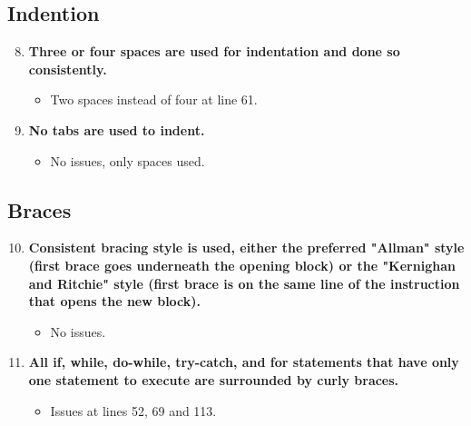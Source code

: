 \documentclass{article}
\begin{document}
		\subsection{Indention}
			\begin{enumerate}
				\setcounter{enumi}{7}
				\item \textbf{Three or four spaces are used for indentation and done so consistently.}
					\begin{itemize}
						\item Two spaces instead of four at line 61.
					\end{itemize}
				\item \textbf{No tabs are used to indent.}
					\begin{itemize}
						\item No issues, only spaces used.
					\end{itemize}
			\end{enumerate}
		\subsection{Braces}
			\begin{enumerate}
				\setcounter{enumi}{9}
				\item \textbf{Consistent bracing style is used, either the preferred "Allman" style (first brace goes underneath the opening block) or the "Kernighan and Ritchie" style (first brace is on the same line of the instruction that opens the new block).}
					\begin{itemize}
						\item No issues.
					\end{itemize}
				\item \textbf{All if, while, do-while, try-catch, and for statements that have only one statement to execute are surrounded by curly braces.}
					\begin{itemize}
						\item Issues at lines 52, 69 and 113.
					\end{itemize}
			\end{enumerate}
\end{document}
